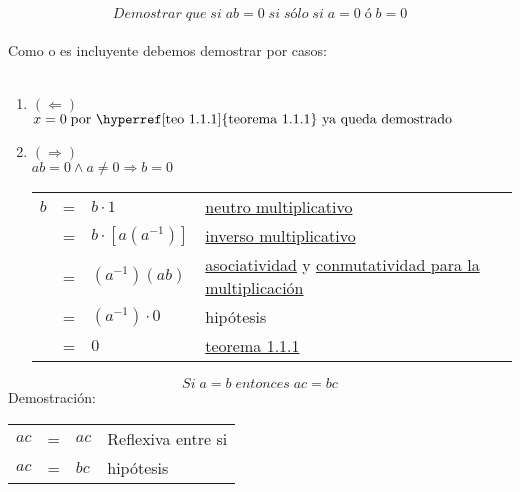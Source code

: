 \begin{teo} \label{teo 1.1.10}
$$Demostrar \; que \; si \; ab=0 \; si \; sólo \; si \; a = 0 \; ó \; b = 0$$\\ \label{teo 1.1.10}
Como o es incluyente debemos demostrar por casos:\\\\

\begin{enumerate}[1.]

\item $(\Leftarrow)$ \\ $x=0 \; \mbox{por \hyperref[teo 1.1.1]{teorema 1.1.1} ya queda demostrado}$

\item $(\Rightarrow)$\\
 $ab=0 \land a\neq 0 \Rightarrow b=0$
\begin{center}
\begin{tabular}{r c l l}
$b$&=&$b\cdot 1$&\hyperref[M4]{neutro multiplicativo}\\
&=&$b\cdot \left[ a (a^{-1}) \right]$&\hyperref[M5]{inverso multiplicativo}\\
&=&$(a^{-1})(ab)$&\hyperref[M3]{asociatividad} y \hyperref[M2]{conmutatividad para la multiplicación}\\
&=&$(a^{-1})\cdot 0$&hipótesis\\
&=&$0$&\hyperref[teo 1.1.1]{teorema 1.1.1}\\
\end{tabular}
\end{center}
\end{enumerate}
\end{teo}

\begin{teo}
$$Si \; a=b \; entonces \; ac = bc$$ \label{teo 1.1.11}
Demostración:
\begin{center}
\begin{tabular}{r c l l}
$ac$&=&$ac$&Reflexiva entre si\\
$ac$&=&$bc$&hipótesis\\
\end{tabular}
\end{center}
\end{teo}

